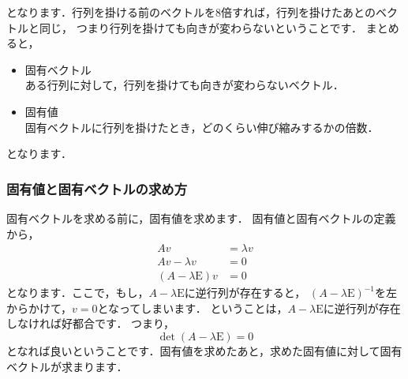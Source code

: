 \documentclass[a4j, uplatex, dvipdfmx]{jsarticle}
\begin{document}
    となります．行列を掛ける前のベクトルを8倍すれば，行列を掛けたあとのベクトルと同じ，
    つまり行列を掛けても向きが変わらないということです．
    まとめると，
      \begin{itemize}
        \item 固有ベクトル\\
          ある行列に対して，行列を掛けても向きが変わらないベクトル．
        \item 固有値\\
          固有ベクトルに行列を掛けたとき，どのくらい伸び縮みするかの倍数．
      \end{itemize}
    となります．
    \subsubsection{固有値と固有ベクトルの求め方}
      固有ベクトルを求める前に，固有値を求めます．
      固有値と固有ベクトルの定義から，
        \begin{align}
          Av &= \lambda v \\
          Av - \lambda v &= 0 \\
          \left(A - \lambda \mathrm{E} \right)v &= 0 \label{eq_eig}
        \end{align}
      となります．ここで，もし，$A - \lambda \mathrm{E}$に逆行列が存在すると，
      $\left(A - \lambda \mathrm{E} \right)^{-1}$を左からかけて，$v = 0$となってしまいます．
      ということは，$A - \lambda \mathrm{E}$に逆行列が存在しなければ好都合です．
      つまり，
        \begin{equation}
          \operatorname{det}\left(A - \lambda \mathrm{E} \right) = 0
        \end{equation}
      となれば良いということです．固有値を求めたあと，求めた固有値に対して固有ベクトルが求まります．
\end{document}
